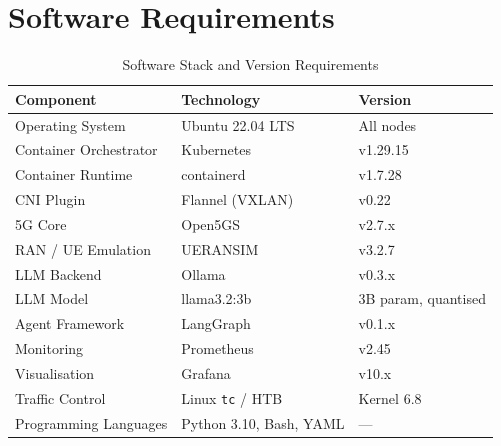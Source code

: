 \section{Software Requirements}

\begin{table}[H]
\centering
\caption{Software Stack and Version Requirements}
\label{tab:software}
\begin{tabular}{lll}
\toprule
\textbf{Component} & \textbf{Technology} & \textbf{Version} \\
\midrule
Operating System       & Ubuntu 22.04 LTS            & All nodes \\
Container Orchestrator & Kubernetes                  & v1.29.15 \\
Container Runtime      & containerd                  & v1.7.28 \\
CNI Plugin             & Flannel (VXLAN)             & v0.22 \\
5G Core                & Open5GS                     & v2.7.x \\
RAN / UE Emulation     & UERANSIM                    & v3.2.7 \\
LLM Backend            & Ollama                      & v0.3.x \\
LLM Model              & llama3.2:3b                 & 3B param, quantised \\
Agent Framework        & LangGraph                   & v0.1.x \\
Monitoring             & Prometheus                  & v2.45 \\
Visualisation          & Grafana                     & v10.x \\
Traffic Control        & Linux \texttt{tc} / HTB     & Kernel 6.8 \\
Programming Languages  & Python 3.10, Bash, YAML     & --- \\
\bottomrule
\end{tabular}
\end{table}
